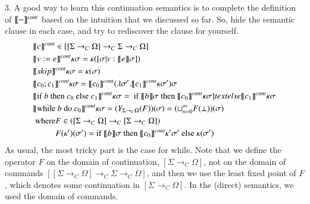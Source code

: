 \documentclass{report}[12pt]
\begin{document}
3. A good way to learn this continuation semantics is to complete the definition of $\llbracket - \rrbracket^{cont}$ based on the intuition that we discussed so far. So, hide the semantic clause in each case, and try to rediscover the clause for yourself.
\begin{align*}
  &\interp{c}^{cont} \in [[\Sigma \rightarrow_C \Omega]\rightarrow_C \Sigma \rightarrow_C \Omega] \\
  &\interp{v:=e}^{cont} \kappa \sigma = \kappa ([\sigma|v:\interp{e}\sigma]) \\
  &\interp{skip}^{cont} \kappa \sigma = \kappa (\sigma) \\
  &\interp{c_0; c_1}^{cont} \kappa \sigma = \interp{c_0}^{cont} (\lambda \sigma'. \interp{c_1}^{cont} \kappa \sigma' ) \sigma \\
  &\interp{\text{if }b \text{ then }c_0 \text{ else }c_1}^{cont} \kappa \sigma =
  \text{ if }\interp{b}\sigma \text{ then }\interp{c_0}^{cont} \kappa \sigma ]text{ else }\interp{c_1}^{cont} \kappa \sigma \\
  &\interp{\text{while }b \text{ do }c_0}^{cont} \kappa \sigma = (Y_{\Sigma \rightarrow_C \Omega}(F))(\sigma) = (\sqcup_{n=0}^\infty F(\bot)) (\sigma) \\
  &\text{  where} F \in ([\Sigma \rightarrow_C \Omega] \rightarrow_C [\Sigma \rightarrow_C \Omega]) \\
  &\phantom{\text{  where}}F(\kappa')(\sigma') = \text{if }\interp{b}\sigma \text{ then }\interp{c_0}^{cont} \kappa' \sigma' \text{ else }\kappa(\sigma')
\end{align*}
As usual, the most tricky part is the case for while. Note that we define the operator $F$ on the domain of continuation, $[\Sigma \rightarrow_C \Omega]$, not on the domain of commands $[[\Sigma \rightarrow_C \Omega]\rightarrow_C \Sigma \rightarrow_C \Omega]$, and then we use the least fixed point of $F$, which denotes some continuation in $[\Sigma \rightarrow_C \Omega]$. In the (direct) semantics, we used the domain of commands.
\end{document}
